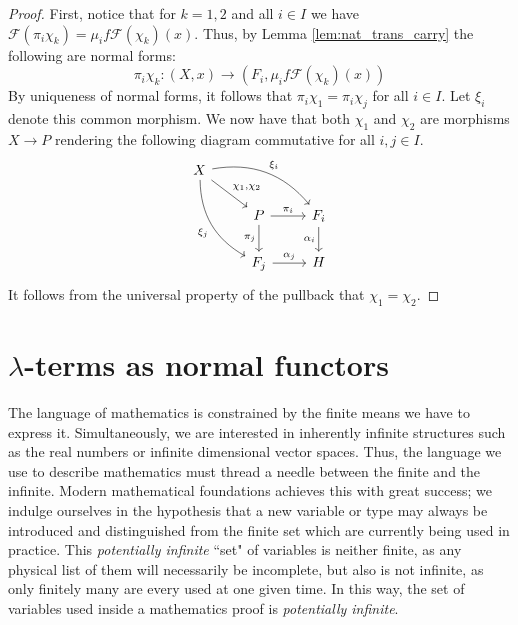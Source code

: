 \documentclass[12pt]{article}
\theoremstyle{plain}
\theoremstyle{definition}
\newcommand{\scr}[1]{\mathscr{#1}}
\newcommand{\lto}{\longrightarrow}
\begin{document}
\begin{proof}
		First, notice that for $k = 1,2$ and all $i \in I$ we have $\scr{F}(\pi_i \chi_k) = \mu_i f \scr{F}(\chi_k)(x)$. Thus, by Lemma \ref{lem:nat_trans_carry} the following are normal forms:
		\begin{equation}
			\pi_i \chi_k: (X,x) \lto (F_i, \mu_i f \scr{F}(\chi_k)(x))
			\end{equation}
		By uniqueness of normal forms, it follows that $\pi_i \chi_1 = \pi_i \chi_j$ for all $i \in I$. Let $\xi_i$ denote this common morphism. We now have that both $\chi_1$ and $\chi_2$ are morphisms $X \lto P$ rendering the following diagram commutative for all $i, j \in I$.
		\begin{equation}
			\begin{tikzcd}
				X\arrow[rrd, bend left,"{\xi_i}"]\arrow[ddr,swap,bend right,"{\xi_j}"]\arrow[dr,"{\chi_1,\chi_2}"]\\
				& P\arrow[r,"{\pi_i}"]\arrow[d,swap,"{\pi_j}"] & F_i\arrow[d,swap,"{\alpha_i}"]\\
				& F_j\arrow[r,"{\alpha_j}"] & H
				\end{tikzcd}
			\end{equation}
		It follows from the universal property of the pullback that $\chi_1 = \chi_2$.
		\end{proof}

\section{$\lambda$-terms as normal functors}
The language of mathematics is constrained by the finite means we have to express it. Simultaneously, we are interested in inherently infinite structures such as the real numbers or infinite dimensional vector spaces. Thus, the language we use to describe mathematics must thread a needle between the finite and the infinite. Modern mathematical foundations achieves this with great success; we indulge ourselves in the hypothesis that a new variable or type may always be introduced and distinguished from the finite set which are currently being used in practice. This \emph{potentially infinite} ``set" of variables is neither finite, as any physical list of them will necessarily be incomplete, but also is not infinite, as only finitely many are every used at one given time. In this way, the set of variables used inside a mathematics proof is \emph{potentially infinite}.
\end{document}
